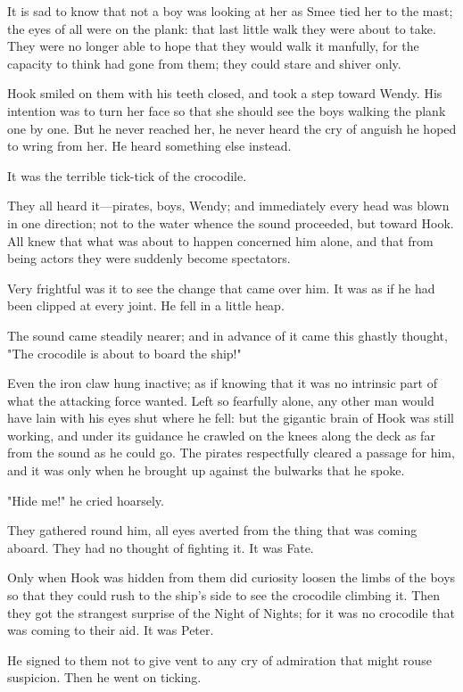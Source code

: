 It is sad to know that not a boy was looking at her as Smee tied her to
the mast; the eyes of all were on the plank: that last little walk they
were about to take. They were no longer able to hope that they would walk
it manfully, for the capacity to think had gone from them; they could
stare and shiver only.


Hook smiled on them with his teeth closed, and took a step toward Wendy.
His intention was to turn her face so that she should see the boys walking
the plank one by one. But he never reached her, he never heard the cry of
anguish he hoped to wring from her. He heard something else instead.


It was the terrible tick-tick of the crocodile.


They all heard it—pirates, boys, Wendy; and immediately every head
was blown in one direction; not to the water whence the sound proceeded,
but toward Hook. All knew that what was about to happen concerned him
alone, and that from being actors they were suddenly become spectators.


Very frightful was it to see the change that came over him. It was as if
he had been clipped at every joint. He fell in a little heap.


The sound came steadily nearer; and in advance of it came this ghastly
thought, "The crocodile is about to board the ship!"


Even the iron claw hung inactive; as if knowing that it was no intrinsic
part of what the attacking force wanted. Left so fearfully alone, any
other man would have lain with his eyes shut where he fell: but the
gigantic brain of Hook was still working, and under its guidance he
crawled on the knees along the deck as far from the sound as he could go.
The pirates respectfully cleared a passage for him, and it was only when
he brought up against the bulwarks that he spoke.


"Hide me!" he cried hoarsely.


They gathered round him, all eyes averted from the thing that was coming
aboard. They had no thought of fighting it. It was Fate.


Only when Hook was hidden from them did curiosity loosen the limbs of the
boys so that they could rush to the ship's side to see the crocodile
climbing it. Then they got the strangest surprise of the Night of Nights;
for it was no crocodile that was coming to their aid. It was Peter.


He signed to them not to give vent to any cry of admiration that might
rouse suspicion. Then he went on ticking.

